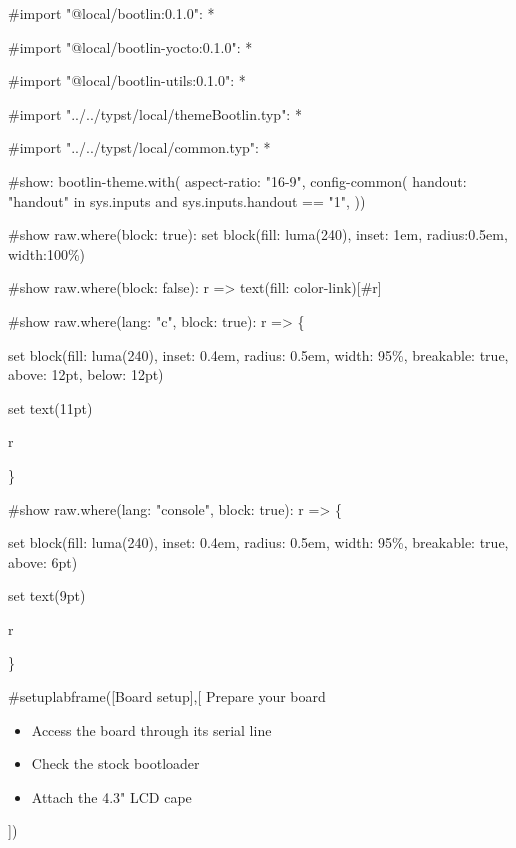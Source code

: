 #import "@local/bootlin:0.1.0": * 

#import "@local/bootlin-yocto:0.1.0": *

#import "@local/bootlin-utils:0.1.0": *

#import "../../typst/local/themeBootlin.typ": *

#import "../../typst/local/common.typ": *

#show: bootlin-theme.with(
  aspect-ratio: "16-9",
config-common(
  handout: "handout" in sys.inputs and sys.inputs.handout == "1",
))

#show raw.where(block: true): set block(fill: luma(240), inset: 1em, radius:0.5em, width:100\%) 

#show raw.where(block: false): r => { text(fill: color-link)[#r] } 

#show raw.where(lang: "c", block: true): r => \{

set block(fill: luma(240),
inset: 0.4em,
radius: 0.5em,
width: 95\%, breakable: true, above: 12pt, below: 12pt)

set text(11pt)

r

\} 


#show raw.where(lang: "console", block: true): r => \{

set block(fill: luma(240),
inset: 0.4em,
radius: 0.5em,
width: 95\%, breakable: true, above: 6pt)

set text(9pt)

r

\} 

 #setuplabframe([Board setup],[
  Prepare your board
  \begin{itemize}
  \item Access the board through its serial line
  \item Check the stock bootloader
  \item Attach the 4.3" LCD cape
  \end{itemize}
])
